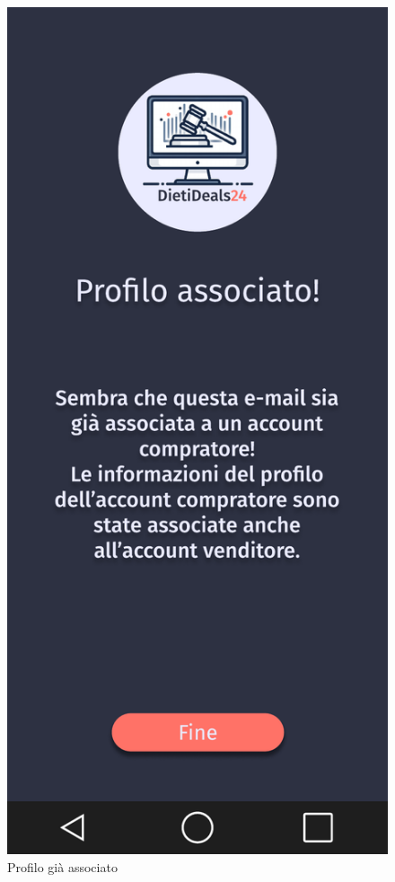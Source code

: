 \begin{figure}[!htb]
\begin{minipage}{0.32\textwidth}
            \includegraphics[width=.7\linewidth]{Immagini/Frames/4.pdf}
            \caption{Profilo già associato}
        \end{minipage}\hfill
        \begin{minipage}{0.32\textwidth}
            \centering

\end{minipage}
\end{figure}
